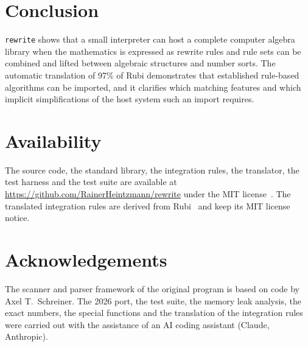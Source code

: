 \documentclass[11pt,a4paper]{article}
\begin{document}
\section{Conclusion}

\texttt{rewrite} shows that a small interpreter can host a complete
computer algebra library when the mathematics is expressed as rewrite rules
and rule sets can be combined and lifted between algebraic structures and
number sorts. The automatic translation of 97\% of Rubi demonstrates that
established rule-based algorithms can be imported, and it clarifies which
matching features and which implicit simplifications of the host system
such an import requires.

\section*{Availability}

The source code, the standard library, the integration rules, the
translator, the test harness and the test suite are available at
\url{https://github.com/RainerHeintzmann/rewrite} under the MIT
license~\cite{rewriterepo}. The translated integration rules are derived
from Rubi~\cite{rubirepo} and keep its MIT license notice.

\section*{Acknowledgements}

The scanner and parser framework of the original program is based on code
by Axel T.\ Schreiner. The 2026 port, the test suite, the memory leak
analysis, the exact numbers, the special functions and the translation of
the integration rules were carried out with the assistance of an AI coding
assistant (Claude, Anthropic).



\end{document}
